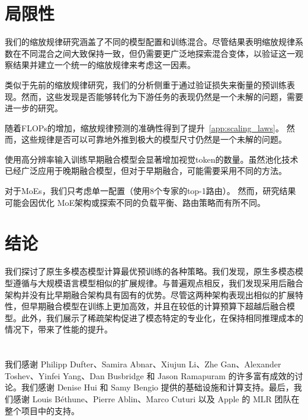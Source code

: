 \section{局限性}

 我们的缩放规律研究涵盖了不同的模型配置和训练混合。尽管结果表明缩放规律系数在不同混合之间大致保持一致，但仍需要更广泛地探索混合变体，以验证这一观察结果并建立一个统一的缩放规律来考虑这一因素。

 类似于先前的缩放规律研究，我们的分析侧重于通过验证损失来衡量的预训练表现。然而，这些发现是否能够转化为下游任务的表现仍然是一个未解的问题，需要进一步的研究。

 随着FLOPs的增加，缩放规律预测的准确性得到了提升~\cref{app:scaling_laws}。 然而，这些规律是否可以可靠地外推到极大的模型尺寸仍然是一个未解的问题。

 使用高分辨率输入训练早期融合模型会显著增加视觉token的数量。虽然池化技术已经广泛应用于晚期融合模型，但对于早期融合，可能需要采用不同的方法。

 对于MoEs，我们只考虑单一配置（使用8个专家的top-1路由）。 然而，研究结果可能会因优化 MoE架构或探索不同的负载平衡、路由策略而有所不同。
\section{结论}
我们探讨了原生多模态模型计算最优预训练的各种策略。我们发现，原生多模态模型遵循与大规模语言模型相似的扩展规律。与普遍观点相反，我们发现采用后融合架构并没有比早期融合架构具有固有的优势。尽管这两种架构表现出相似的扩展特性，但早期融合模型在训练上更加高效，并且在较低的计算预算下超越后融合模型。此外，我们展示了稀疏架构促进了模态特定的专业化，在保持相同推理成本的情况下，带来了性能的提升。
\section*{} 我们感谢 Philipp Dufter、Samira Abnar、Xiujun Li、Zhe Gan、Alexander Toshev、Yinfei Yang、Dan Busbridge 和 Jason Ramapuram 的许多富有成效的讨论。我们感谢 Denise Hui 和 Samy Bengio 提供的基础设施和计算支持。最后，我们感谢 Louis Béthune、Pierre Ablin、Marco Cuturi 以及 Apple 的 MLR 团队在整个项目中的支持。

